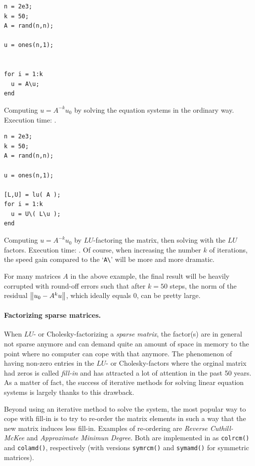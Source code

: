 \hfill
\begin{minipage}[t]{.45\textwidth}
\begin{lstlisting}[framerule=2pt,rulecolor=\color{badred}]
n = 2e3;
k = 50;
A = rand(n,n);

u = ones(n,1);


for i = 1:k
  u = A\u;
end
\end{lstlisting}
Computing $u = A^{-k}u_0$ by solving the equation systems in the ordinary way.
Execution time: .
\end{minipage}
\hfill
\begin{minipage}[t]{.45\textwidth}
\begin{lstlisting}[framerule=2pt,rulecolor=\color{goodgreen}]
n = 2e3;
k = 50;
A = rand(n,n);

u = ones(n,1);

[L,U] = lu( A );
for i = 1:k
  u = U\( L\u );
end
\end{lstlisting}
Computing $u = A^{-k}u_0$ by $LU$-factoring the matrix, then solving with the $LU$ factors. Execution time: . Of course, when increasing  the number $k$ of iterations, the speed gain compared to the `\lstinline!A\!' will  be more and more dramatic.
\end{minipage}
\hfill

\begin{remark}
For many matrices $A$ in the above example, the final result will be heavily corrupted with round-off errors such that after $k=50$ steps, the norm of the residual $\left\|u_0-A^ku\right\|$, which ideally equals $0$, can be pretty large.
\end{remark}


\paragraph{Factorizing sparse matrices.}
When $LU$- or Cholesky-factorizing a \emph{sparse matrix}, the factor(s) are in
general not sparse anymore and can demand quite an amount of space in memory to
the point where no computer can cope with that anymore. The phenomenon of
having non-zero entries in the $LU$- or Cholesky-factors where the orginal
matrix had zeros is called \emph{fill-in} and has attracted a lot of attention
in the past 50 years. As a matter of fact, the success of iterative methods for
solving linear equation systems is largely thanks to this drawback.

Beyond using an iterative method to solve the system, the most popular way to
cope with fill-in is to try to re-order the matrix elements in such a way that
the new matrix induces less fill-in. Examples of re-ordering are \emph{Reverse
Cuthill-McKee} and \emph{Approximate Minimun Degree}. Both are implemented in
\matlab{} as \lstinline!colrcm()! and \lstinline!colamd()!, respectively (with
versions \lstinline!symrcm()! and \lstinline!symamd()! for symmetric matrices).


